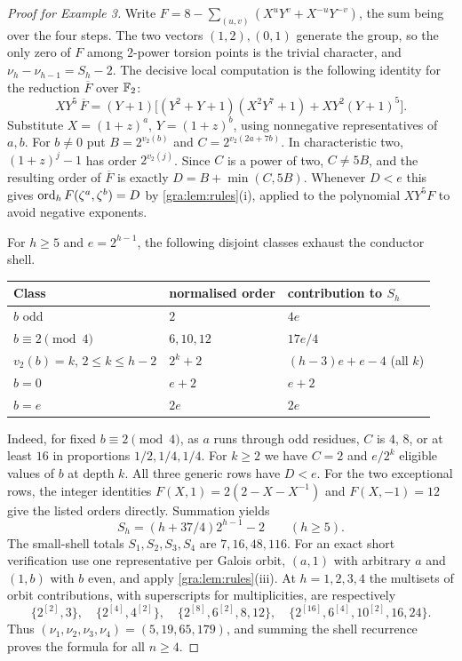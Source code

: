 \begin{proof}[Proof for Example 3]
Write $F=8-\sum_{(u,v)}(X^uY^v+X^{-u}Y^{-v})$, the sum being over the four
steps. The two vectors $(1,2),(0,1)$ generate the group, so the only zero
of $F$ among $2$-power torsion points is the trivial character, and
$\nu_h-\nu_{h-1}=S_h-2$. The decisive local computation is the following
identity for the reduction $\overline F$ over $\mathbb{F}_2$:
\[
 XY^5\,\overline F=(Y+1)\bigl[(Y^2+Y+1)(X^2Y^7+1)+XY^2(Y+1)^5\bigr].
\]
Substitute $X=(1+z)^a$, $Y=(1+z)^b$, using nonnegative representatives of
$a,b$. For $b\ne0$ put $B=2^{v_2(b)}$ and $C=2^{v_2(2a+7b)}$. In
characteristic two, $(1+z)^j-1$ has order $2^{v_2(j)}$. Since $C$ is a
power of two, $C\ne5B$, and the resulting order of $\overline F$ is exactly
$D=B+\min(C,5B)$. Whenever $D<e$ this gives $\operatorname{ord}_hF(\zeta^a,\zeta^b)=D$ by
\cref{gra:lem:rules}(i), applied to the polynomial $XY^5F$ to avoid
negative exponents.

For $h\ge5$ and $e=2^{h-1}$, the following disjoint classes exhaust the
conductor shell.
\begin{center}\small\upshape
\begin{tabular}{lll}
\toprule
Class & normalised order & contribution to $S_h$\\
\midrule
$b$ odd & $2$ & $4e$\\
$b\equiv2\pmod4$ & $6,10,12$ & $17e/4$\\
$v_2(b)=k$, $2\le k\le h-2$ & $2^k+2$ & $(h-3)e+e-4$ (all $k$)\\
$b=0$ & $e+2$ & $e+2$\\
$b=e$ & $2e$ & $2e$\\
\bottomrule
\end{tabular}
\end{center}
Indeed, for fixed $b\equiv2\pmod4$, as $a$ runs through odd residues, $C$
is $4$, $8$, or at least $16$ in proportions $1/2,1/4,1/4$. For $k\ge2$ we
have $C=2$ and $e/2^k$ eligible values of $b$ at depth $k$. All three
generic rows have $D<e$. For the two exceptional rows, the integer
identities $F(X,1)=2(2-X-X^{-1})$ and $F(X,-1)=12$ give the listed orders
directly. Summation yields
\[
 S_h=(h+37/4)2^{h-1}-2\qquad(h\ge5).
\]
The small-shell totals $S_1,S_2,S_3,S_4$ are $7,16,48,116$. For an exact
short verification use one representative per Galois orbit, $(a,1)$ with
arbitrary $a$ and $(1,b)$ with $b$ even, and apply
\cref{gra:lem:rules}(iii). At $h=1,2,3,4$ the multisets of orbit
contributions, with superscripts for multiplicities, are respectively
\[
 \{2^{[2]},3\},\quad\{2^{[4]},4^{[2]}\},\quad
 \{2^{[8]},6^{[2]},8,12\},\quad\{2^{[16]},6^{[4]},10^{[2]},16,24\}.
\]
Thus $(\nu_1,\nu_2,\nu_3,\nu_4)=(5,19,65,179)$, and summing the shell
recurrence proves the formula for all $n\ge4$.
\end{proof}

